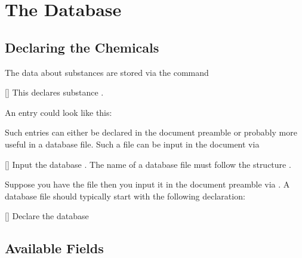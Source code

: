 \documentclass[load-preamble+]{cnltx-doc}
\begin{document}
\section{The Database}
\subsection{Declaring the Chemicals}
The data about substances are stored via the command
\begin{commands}
  []
    This declares substance .
\end{commands}
An entry could look like this:
\begin{sourcecode}
\end{sourcecode}

Such entries can either be declared in the document
preamble or probably more useful in a database file. Such a file can be input
in the document via
\begin{commands}
  []
    Input the database .  The name of a database file must
    follow the structure
    .
\end{commands}
Suppose you have the file  then you
input it in the document preamble via .  A
database file should typically start with the following declaration:
\begin{commands}
  []
    Declare the database 
\end{commands}

\subsection{Available Fields}
\end{document}

